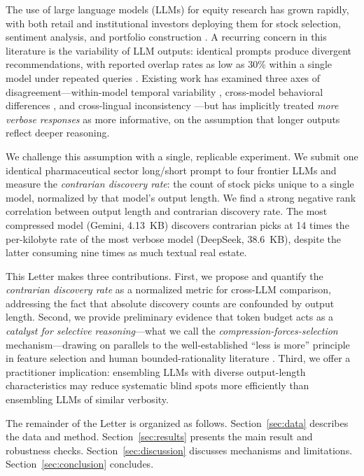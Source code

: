 \documentclass[11pt,letterpaper]{article}
\begin{document}
The use of large language models (LLMs) for equity research has grown rapidly, with both retail and institutional investors deploying them for stock selection, sentiment analysis, and portfolio construction \citep{blankespoor2024,schneider2025}. A recurring concern in this literature is the variability of LLM outputs: identical prompts produce divergent recommendations, with reported overlap rates as low as 30\% within a single model under repeated queries \citep{schneider2025}. Existing work has examined three axes of disagreement---within-model temporal variability \citep{schneider2025}, cross-model behavioral differences \citep{park2025}, and cross-lingual inconsistency \citep{lim2025}---but has implicitly treated \textit{more verbose responses} as more informative, on the assumption that longer outputs reflect deeper reasoning.

We challenge this assumption with a single, replicable experiment. We submit one identical pharmaceutical sector long/short prompt to four frontier LLMs and measure the \textit{contrarian discovery rate}: the count of stock picks unique to a single model, normalized by that model's output length. We find a strong negative rank correlation between output length and contrarian discovery rate. The most compressed model (Gemini, 4.13~KB) discovers contrarian picks at 14 times the per-kilobyte rate of the most verbose model (DeepSeek, 38.6~KB), despite the latter consuming nine times as much textual real estate.

This Letter makes three contributions. First, we propose and quantify the \textit{contrarian discovery rate} as a normalized metric for cross-LLM comparison, addressing the fact that absolute discovery counts are confounded by output length. Second, we provide preliminary evidence that token budget acts as a \textit{catalyst for selective reasoning}---what we call the \textit{compression-forces-selection} mechanism---drawing on parallels to the well-established ``less is more'' principle in feature selection \citep{tibshirani1996} and human bounded-rationality literature \citep{simon1956}. Third, we offer a practitioner implication: ensembling LLMs with diverse output-length characteristics may reduce systematic blind spots more efficiently than ensembling LLMs of similar verbosity.

The remainder of the Letter is organized as follows. Section~\ref{sec:data} describes the data and method. Section~\ref{sec:results} presents the main result and robustness checks. Section~\ref{sec:discussion} discusses mechanisms and limitations. Section~\ref{sec:conclusion} concludes.
\end{document}
